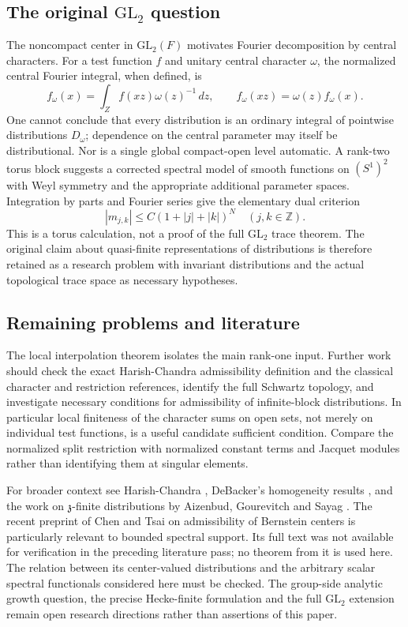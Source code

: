 \subsection{The original $\mathrm{GL}_2$ question}
The noncompact center in $\mathrm{GL}_2(F)$ motivates Fourier decomposition by central characters. For a test function $f$ and unitary central character $\omega$, the normalized central Fourier integral, when defined, is
\[
f_\omega(x)=\int_Z f(xz)\omega(z)^{-1}\,dz,\qquad
f_\omega(xz)=\omega(z)f_\omega(x).
\]
One cannot conclude that every distribution is an ordinary integral of pointwise distributions $D_\omega$; dependence on the central parameter may itself be distributional. Nor is a single global compact-open level automatic. A rank-two torus block suggests a corrected spectral model of smooth functions on $(S^1)^2$ with Weyl symmetry and the appropriate additional parameter spaces. Integration by parts and Fourier series give the elementary dual criterion
\[
|m_{j,k}|\le C(1+|j|+|k|)^N
\quad (j,k\in\mathbb Z).
\]
This is a torus calculation, not a proof of the full $\mathrm{GL}_2$ trace theorem. The original claim about quasi-finite representations of distributions is therefore retained as a research problem with invariant distributions and the actual topological trace space as necessary hypotheses.

\subsection{Remaining problems and literature}
The local interpolation theorem isolates the main rank-one input. Further work should check the exact Harish-Chandra admissibility definition and the classical character and restriction references, identify the full Schwartz topology, and investigate necessary conditions for admissibility of infinite-block distributions. In particular local finiteness of the character sums on open sets, not merely on individual test functions, is a useful candidate sufficient condition. Compare the normalized split restriction with normalized constant terms and Jacquet modules rather than identifying them at singular elements.

For broader context see Harish-Chandra \cite{HC99}, DeBacker's homogeneity results \cite{De02}, and the work on $\mathfrak z$-finite distributions by Aizenbud, Gourevitch and Sayag \cite{AGS15}. The recent preprint of Chen and Tsai \cite{CT26} on admissibility of Bernstein centers is particularly relevant to bounded spectral support. Its full text was not available for verification in the preceding literature pass; no theorem from it is used here. The relation between its center-valued distributions and the arbitrary scalar spectral functionals considered here must be checked. The group-side analytic growth question, the precise Hecke-finite formulation and the full $\mathrm{GL}_2$ extension remain open research directions rather than assertions of this paper.
